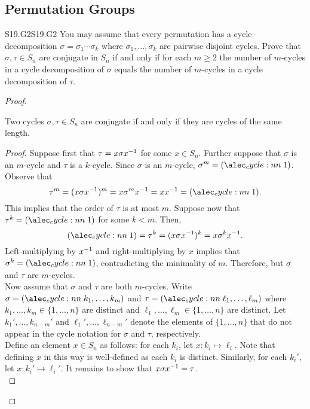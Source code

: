 \documentclass[../AlgebraQualSolutions.tex]{subfiles}
\begin{document}
\subsection{Permutation Groups}

\begin{prob}{S19.G2}{S19.G2}
    You may assume that every permutation has a cycle decomposition $\sigma = \sigma_1 \cdots \sigma_k$ where $\sigma_1, \ldots, \sigma_k$ are pairwise disjoint cycles. Prove that $\sigma, \tau \in S_n$ are conjugate in $S_n$ if and only if for each $m \geq 2$ the number of $m$-cycles in a cycle decomposition of $\sigma$ equals the number of $m$-cycles in a cycle decomposition of $\tau$.
\end{prob}

\begin{proof}
\begin{claim}

    Two cycles $\sigma, \tau \in S_n$ are conjugate if and only if they are cycles of the same length.
    \begin{proof}
        Suppose first that $\tau = x \sigma x^{-1}$ for some $x \in S_n$. Further suppose that $\sigma$ is an $m$-cycle and $\tau$ is a $k$-cycle. Since $\sigma$ is an $m$-cycle, $\sigma^m = \cycle{1}$. Observe that
            \[\tau^m = (x\sigma x\inv)^m = x\sigma^m x\inv = xx\inv = \cycle{1}.\]
        This implies that the order of $\tau$ is at most $m$. Suppose now that $\tau^k = \cycle{1}$ for some $k < m$. Then, 
            \[\cycle{1} = \tau^k = (x\sigma x\inv)^k = x \sigma^k x\inv.\]
        Left-multiplying by $x^{-1}$ and right-multiplying by $x$ implies that $\sigma^k = \cycle{1}$, contradicting the minimality of $m$. Therefore, but $\sigma$ and $\tau$ are $m$-cycles.\\
        
        Now assume that $\sigma$ and $\tau$ are both $m$-cycles. Write $\sigma = \cycle{k_1, \ldots, k_m}$ and $\tau = \cycle{\ell_1, \ldots, \ell_m}$ where $k_1,\ldots,k_m \in \{1,\ldots, n\}$ are distinct and $\ell_1, \ldots, \ell_m \in \{1,\ldots, n\}$ are  distinct. Let $k_1', \ldots, k_{n-m}'$ and $\ell_1', \ldots, \ell_{n-m}'$ denote the elements of $\{1,\ldots, n\}$ that do not appear in the cycle notation for $\sigma$ and $\tau$, respectively.\\

        Define an element $x \in S_n$ as follows: for each $k_i$, let $x: k_i \mapsto \ell_i$. Note that defining $x$ in this way is well-defined as each $k_i$ is distinct. Similarly, for each $k_i'$, let $x: k_i' \mapsto \ell_i'$. It remains to show that $x\sigma x ^{-1} = \tau$.\\


\end{proof}
\end{claim}
\end{proof}
\end{document}

